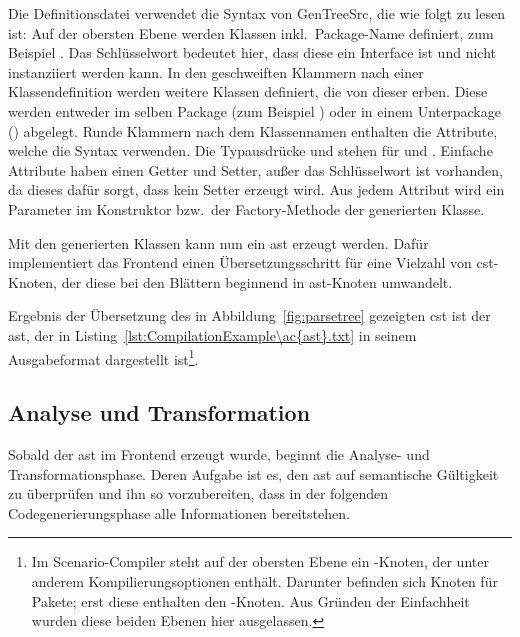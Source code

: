 Die Definitionsdatei verwendet die Syntax von GenTreeSrc, die wie folgt zu lesen ist:
Auf der obersten Ebene werden Klassen inkl.\ Package-Name definiert, zum Beispiel .
Das Schlüsselwort  bedeutet hier, dass diese ein Interface ist und nicht instanziiert werden kann.
In den geschweiften Klammern nach einer Klassendefinition werden weitere Klassen definiert, die von dieser erben.
Diese werden entweder im selben Package (zum Beispiel ) oder in einem Unterpackage () abgelegt.
Runde Klammern nach dem Klassennamen enthalten die Attribute, welche die Syntax  verwenden.
Die Typausdrücke \code{[T]} und \code{[T:U]} stehen für  und .
Einfache Attribute haben einen Getter und Setter, außer das Schlüsselwort  ist vorhanden, da dieses dafür sorgt, dass kein Setter erzeugt wird.
Aus jedem Attribut wird ein Parameter im Konstruktor bzw.\ der Factory-Methode der generierten Klasse.

Mit den generierten Klassen kann nun ein \ac{ast} erzeugt werden.
Dafür implementiert das Frontend einen Übersetzungsschritt für eine Vielzahl von \ac{cst}-Knoten, der diese bei den Blättern beginnend in \ac{ast}-Knoten umwandelt.

Ergebnis der Übersetzung des in Abbildung~\ref{fig:parsetree} gezeigten \ac{cst} ist der \ac{ast}, der in Listing~\ref{lst:CompilationExample\ac{ast}.txt} in seinem Ausgabeformat dargestellt ist\footnote{
    Im Scenario-Compiler steht auf der obersten Ebene ein -Knoten, der unter anderem Kompilierungsoptionen enthält.
    Darunter befinden sich Knoten für Pakete;
    erst diese enthalten den -Knoten.
    Aus Gründen der Einfachheit wurden diese beiden Ebenen hier ausgelassen.
}.


\subsection{Analyse und Transformation}\label{subsec:data-model-gentreesrc}

Sobald der \ac{ast} im Frontend erzeugt wurde, beginnt die Analyse- und Transformationsphase.
Deren Aufgabe ist es, den \ac{ast} auf semantische Gültigkeit zu überprüfen und ihn so vorzubereiten, dass in der folgenden Codegenerierungsphase alle Informationen bereitstehen.

